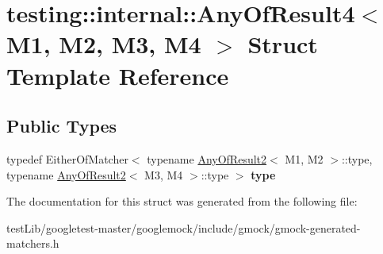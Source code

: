 \hypertarget{structtesting_1_1internal_1_1AnyOfResult4}{}\section{testing\+:\+:internal\+:\+:Any\+Of\+Result4$<$ M1, M2, M3, M4 $>$ Struct Template Reference}
\label{structtesting_1_1internal_1_1AnyOfResult4}
\subsection*{Public Types}
\begin{DoxyCompactItemize}
\item 
\mbox{\label{structtesting_1_1internal_1_1AnyOfResult4_a4f3c9aebb4f7fc24287b59a0bdf1a4a6}} 
typedef Either\+Of\+Matcher$<$ typename \hyperlink{structtesting_1_1internal_1_1AnyOfResult2}{Any\+Of\+Result2}$<$ M1, M2 $>$\+::type, typename \hyperlink{structtesting_1_1internal_1_1AnyOfResult2}{Any\+Of\+Result2}$<$ M3, M4 $>$\+::type $>$ {\bfseries type}
\end{DoxyCompactItemize}


The documentation for this struct was generated from the following file\+:\begin{DoxyCompactItemize}
\item 
test\+Lib/googletest-\/master/googlemock/include/gmock/gmock-\/generated-\/matchers.\+h\end{DoxyCompactItemize}
